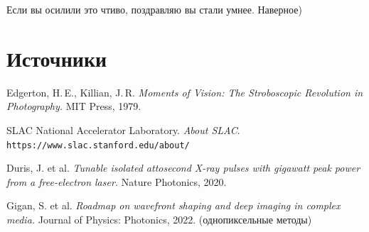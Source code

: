 \documentclass[a4paper, 11pt]{extarticle}
\begin{document}
Если вы осилили это чтиво, поздравляю вы стали умнее. Наверное)

\section*{Источники}

\begin{enumerate}[label={[\arabic*]}]
    \item Edgerton, H.\,E., Killian, J.\,R. \textit{Moments of Vision: The Stroboscopic Revolution in Photography.} MIT Press, 1979.
    \item SLAC National Accelerator Laboratory. \textit{About SLAC}. \texttt{https://www.slac.stanford.edu/about/}
    \item Duris, J. et al. \textit{Tunable isolated attosecond X-ray pulses with gigawatt peak power from a free-electron laser.} Nature Photonics, 2020.
    \item Gigan, S. et al. \textit{Roadmap on wavefront shaping and deep imaging in complex media.} Journal of Physics: Photonics, 2022. (однопиксельные методы)
\end{enumerate}
\end{document}
